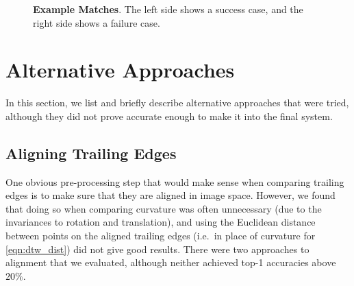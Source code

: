 \begin{figure}[t]%
\centering
{}
\newline
{}
\newline
{}
\newline
{}
\newline
{}
\newline
{}
\caption{\textbf{Example Matches}. The left side shows a success case, and the right side shows a failure case.} 
\label{fig:example_match}
\end{figure}

\section{Alternative Approaches}

In this section, we list and briefly describe alternative approaches that were tried, although they did not prove accurate enough to make it into the final system.

\subsection{Aligning Trailing Edges}

One obvious pre-processing step that would make sense when comparing trailing edges is to make sure that they are aligned in image space.
However, we found that doing so when comparing curvature was often unnecessary (due to the invariances to rotation and translation), and using the Euclidean distance between points on the aligned trailing edges (i.e.\ in place of curvature for \eqref{eqn:dtw_dist}) did not give good results.
There were two approaches to alignment that we evaluated, although neither achieved top-1 accuracies above $20\%$.

